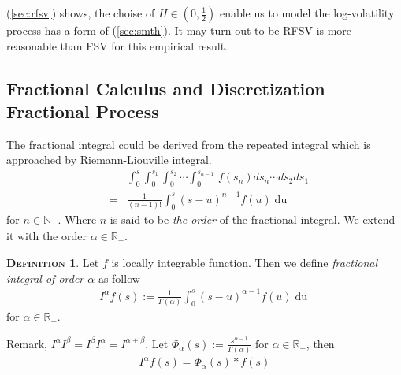 \documentclass[a4paper, twoside, 11pt]{article}
\theoremstyle{definition}
\newtheorem{definition}{\scshape Definition}[section]
\begin{document}
(\ref{sec:rfsv}) shows, the choise of $H\in(0,\frac{1}{2})$ enable us to model the log-volatility process has a form of (\ref{sec:smth}). It may turn out to be RFSV is more reasonable than FSV for this empirical result.

\subsection{Fractional Calculus and Discretization Fractional Process}
The fractional integral could be derived from the repeated integral which is approached by Riemann-Liouville integral.
\begin{eqnarray*}
  &&\int_0^s\int_0^{s_1}\int_0^{s_2}\cdots\int_0^{s_{n-1}}\, f(s_n)ds_n\cdots ds_2 ds_1\\
  &=& \frac{1}{(n-1)!} \int_0^s (s-u)^{n-1} f(u) \mathop{du}
\end{eqnarray*}
for $n\in \mathbb{N}_+$. Where $n$ is said to be \emph{the order} of the fractional integral. We extend it with the order $\alpha \in \mathbb{R}_+$.
\begin{definition}
  Let $f$ is locally integrable function. Then we define \emph{fractional integral of order $\alpha$} as follow
\begin{eqnarray}
  I^\alpha f(s) := \frac{1}{\Gamma(\alpha)} \int^s_0 (s-u)^{\alpha-1} f(u) \mathop{du}
  \label{sec:fraint}
\end{eqnarray}
for $\alpha \in \mathbb{R}_+$.
\end{definition}

Remark, $I^\alpha I^\beta = I^\beta I^\alpha = I^{\alpha+\beta}$.
Let $\Phi_\alpha(s):= \frac{s^{\alpha-1}}{\Gamma(\alpha)}$ for $\alpha \in \mathbb{R}_+$, then
\begin{eqnarray}
  I^\alpha f(s) = \Phi_\alpha(s) \ast f(s)
\end{eqnarray}
\end{document}
